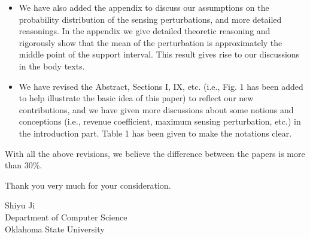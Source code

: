 \documentclass{article}
\begin{document}
\begin{itemize}
\item We have also added the appendix to discuss our assumptions on the probability distribution of the sensing perturbations, and more detailed reasonings. In the appendix we give detailed theoretic reasoning and rigorously show that the mean of the perturbation is approximately the middle point of the support interval. This result gives rise to our discussions in the body texts.
\item We have revised the Abstract, Sections I, IX, etc. (i.e., Fig. 1 has been added to help illustrate the basic idea of this paper) to reflect our new contributions, and we have given more discussions about some notions and conceptions (i.e., revenue coefficient, maximum sensing perturbation, etc.) in the introduction part. Table 1 has been given to make the notations clear.
\end{itemize}

With all the above revisions, we believe the difference between the papers is more than 30\%.

Thank you very much for your consideration.

Shiyu Ji\\
Department of Computer Science\\
Oklahoma State University
\end{document}
